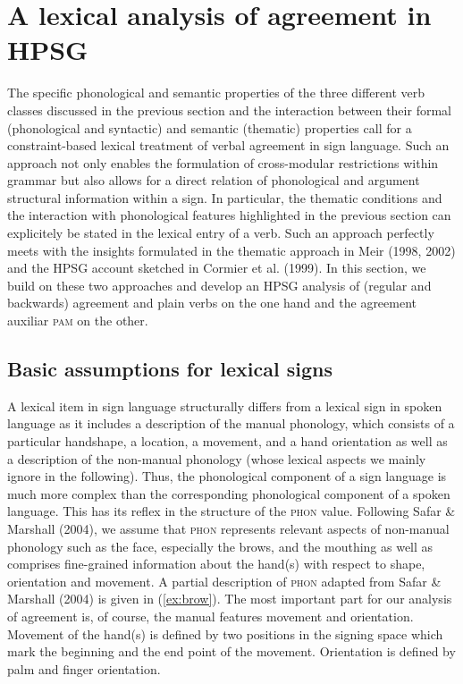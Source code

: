\documentclass[11pt,a4paper,fleqn]{article}
\begin{document}
\section{A lexical analysis of agreement in HPSG}

The specific phonological and semantic properties of the three different verb classes discussed in the previous section and the interaction between their formal (phonological and syntactic) and semantic (thematic) properties call for a constraint-based lexical treatment of verbal agreement in sign language. Such an approach not only enables the formulation of cross-modular restrictions within grammar but also  allows for a direct relation of phonological and argument structural information within a sign. In particular, the thematic conditions and the interaction with phonological features highlighted in the previous section can explicitely be stated in the lexical entry of a verb. Such an approach perfectly meets with the insights formulated in the thematic approach in Meir (1998, 2002) and the HPSG account sketched in Cormier et al. (1999). In this section, we build on these two approaches and develop an HPSG analysis of (regular and backwards) agreement and plain verbs on the one hand and the agreement auxiliar \textsc{pam} on the other.


\subsection{Basic assumptions for lexical signs}

A lexical item in sign language structurally differs from a lexical sign in spoken language as it includes a description of the manual phonology, which consists of a particular handshape, a location, a movement, and a hand orientation as well as a description of the non-manual phonology (whose lexical aspects we mainly ignore  in the following). Thus, the phonological component of a sign language is much more complex than the corresponding phonological component of a spoken language. This has its reflex in the structure of the \textsc{phon} value. Following Safar \& Marshall (2004), we assume that \textsc{phon} represents relevant aspects of non-manual phonology such as the face, especially the brows, and the mouthing as well as comprises fine-grained information about the hand(s) with respect to shape, orientation and movement. A partial description of \textsc{phon} adapted from Safar \& Marshall (2004) is given in (\ref{ex:brow}). The most important part for our analysis of agreement is, of course, the manual features  movement and orientation. Movement of the hand(s) is defined by two positions in the signing space which mark the beginning and the end point of the movement. Orientation is defined by palm and finger orientation.
 
\end{document}
